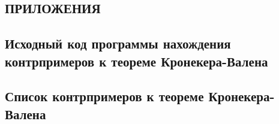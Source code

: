 \documentclass[_00_dissertation.tex]{subfiles}
\begin{document}
\onlyinsubfile{
    \renewcommand{\contentsname}{ОГЛАВЛЕНИЕ}
    \setcounter{tocdepth}{3}
    \tableofcontents
}

\begin{center}
    \chapter*{ПРИЛОЖЕНИЯ}\label{section:Appendix_code}
\end{center}

\section*{Исходный код программы нахождения контрпримеров к теореме Кронекера-Валена}\label{section:Appendix_code}

% 

\section*{Список контрпримеров к теореме Кронекера-Валена}\label{section:Appendix_counterexample}
\end{document}
